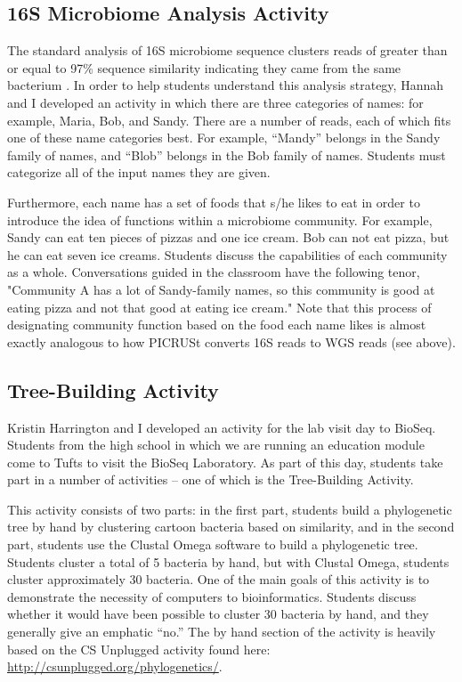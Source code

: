 \documentclass{report}
\begin{document}
\subsection{16S Microbiome Analysis Activity}
The standard analysis of 16S microbiome sequence clusters reads of greater than or equal to 97\% sequence similarity indicating they came from the same bacterium \cite{glockner2000comparative}. In order to help students understand this analysis strategy, Hannah and I developed an activity in which there are three categories of names: for example, Maria, Bob, and Sandy. There are a number of reads, each of which fits one of these name categories best. For example, ``Mandy'' belongs in the Sandy family of names, and ``Blob'' belongs in the Bob family of names. Students must categorize all of the input names they are given.

Furthermore, each name has a set of foods that s/he likes to eat in order to introduce the idea of functions within a microbiome community. For example, Sandy can eat ten pieces of pizzas and one ice cream. Bob can not eat pizza, but he can eat seven ice creams. Students discuss the capabilities of each community as a whole. Conversations guided in the classroom have the following tenor, "Community A has a lot of Sandy-family names, so this community is good at eating pizza and not that good at eating ice cream." Note that this process of designating community function based on the food each name likes is almost exactly analogous to how PICRUSt converts 16S reads to WGS reads (see above).

\subsection{Tree-Building Activity}
Kristin Harrington and I developed an activity for the lab visit day to BioSeq. Students from the high school in which we are running an education module come to Tufts to visit the BioSeq Laboratory. As part of this day, students take part in a number of activities -- one of which is the Tree-Building Activity.

This activity consists of two parts: in the first part, students build a phylogenetic tree by hand by clustering cartoon bacteria based on similarity, and in the second part, students use the Clustal Omega software to build a phylogenetic tree. Students cluster a total of 5 bacteria by hand, but with Clustal Omega, students cluster approximately 30 bacteria. One of the main goals of this activity is to demonstrate the necessity of computers to bioinformatics. Students discuss whether it would have been possible to cluster 30 bacteria by hand, and they generally give an emphatic ``no.'' The by hand section of the activity is heavily based on the CS Unplugged activity found here: \url{http://csunplugged.org/phylogenetics/}.
\end{document}
